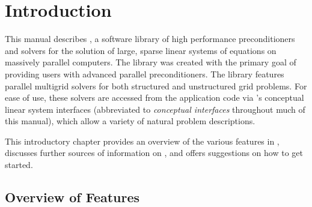 
\chapter{Introduction}
\label{ch-Introduction}

This manual describes \hypre{}, a software library of high performance
preconditioners and solvers for the solution of large, sparse linear systems of
equations on massively parallel computers.  The \hypre{} library was created
with the primary goal of providing users with advanced parallel preconditioners.
The library features parallel multigrid solvers for both structured and
unstructured grid problems.  For ease of use, these solvers are accessed from
the application code via \hypre{}'s conceptual linear system interfaces
(abbreviated to {\em conceptual interfaces} throughout much of this manual),
which allow a variety of natural problem descriptions.

This introductory chapter provides an overview of the various features in
\hypre{}, discusses further sources of information on \hypre{}, and
offers suggestions on how to get started.


\section{Overview of Features}
\label{Features}

